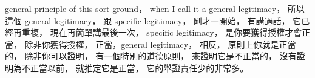 \hypertarget{w02:cue:2469}{}general principle of this sort ground，
\hypertarget{w02:cue:2470}{}when I call it a general legitimacy，
\hypertarget{w02:cue:2471}{}所以這個 general legitimacy，
\hypertarget{w02:cue:2472}{}跟 specific legitimacy，
\hypertarget{w02:cue:2473}{}剛才一開始，
\hypertarget{w02:cue:2474}{}有講過話，
\hypertarget{w02:cue:2475}{}它已經再重複，
\hypertarget{w02:cue:2476}{}現在再簡單講最後一次，
\hypertarget{w02:cue:2477}{}specific legitimacy，
\hypertarget{w02:cue:2478}{}是你要獲得授權才會正當，
\hypertarget{w02:cue:2479}{}除非你獲得授權，
\hypertarget{w02:cue:2480}{}正當，general legitimacy，
\hypertarget{w02:cue:2481}{}相反，
\hypertarget{w02:cue:2482}{}原則上你就是正當的，
\hypertarget{w02:cue:2483}{}除非你可以證明，
\hypertarget{w02:cue:2484}{}有一個特別的道德原則，
\hypertarget{w02:cue:2485}{}來證明它是不正當的，
\hypertarget{w02:cue:2486}{}沒有證明為不正當以前，
\hypertarget{w02:cue:2487}{}就推定它是正當，
\hypertarget{w02:cue:2488}{}它的舉證責任少的非常多。

